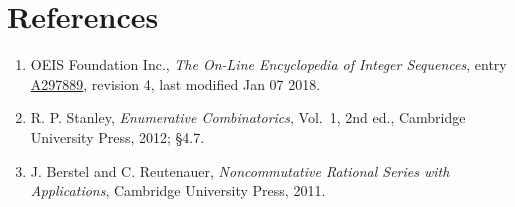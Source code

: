 \documentclass[11pt]{article}
\theoremstyle{definition}
\begin{document}
\section{References}

\begin{enumerate}

\item OEIS Foundation Inc., \emph{The On-Line Encyclopedia of Integer Sequences}, entry \href{https://oeis.org/A297889}{A297889}, revision 4, last modified Jan 07 2018.

\item R. P. Stanley, \emph{Enumerative Combinatorics}, Vol.~1, 2nd ed., Cambridge University Press, 2012; \S4.7.

\item J. Berstel and C. Reutenauer, \emph{Noncommutative Rational Series with Applications}, Cambridge University Press, 2011.

\end{enumerate}
\end{document}
